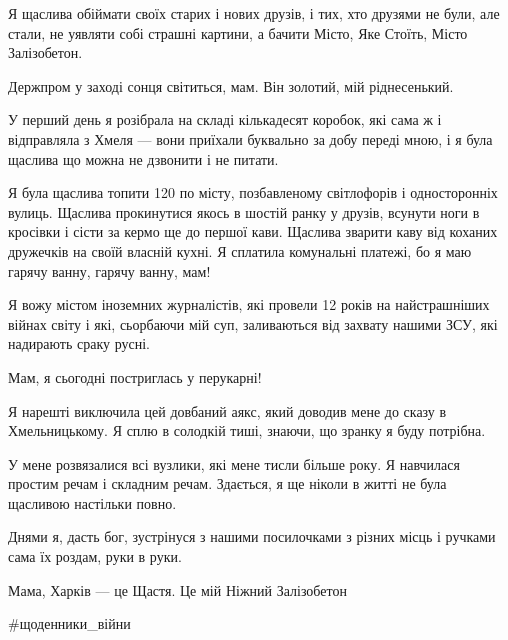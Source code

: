 Я щаслива обіймати своїх старих і нових друзів, і тих, хто друзями не були, але
стали, не уявляти собі страшні картини, а бачити Місто, Яке Стоїть, Місто
Залізобетон.


Держпром у заході сонця світиться, мам. Він золотий, мій ріднесенький.

У перший день я розібрала на складі кількадесят коробок, які сама ж і
відправляла з Хмеля — вони приїхали буквально за добу переді мною, і я була
щаслива що можна не дзвонити і не питати. 


Я була щаслива топити 120 по місту, позбавленому світлофорів і односторонніх
вулиць. Щаслива прокинутися якось в шостій ранку у друзів, всунути ноги в
кросівки і сісти за кермо ще до першої кави. Щаслива зварити каву від коханих
дружечків на своїй власній кухні. Я сплатила комунальні платежі, бо я маю
гарячу ванну, гарячу ванну, мам!


Я вожу містом іноземних журналістів, які провели 12 років на найстрашніших
війнах світу і які, сьорбаючи мій суп, заливаються від захвату нашими ЗСУ, які
надирають сраку русні. 


Мам, я сьогодні постриглась у перукарні!

Я нарешті виключила цей довбаний аякс, який доводив мене до сказу в
Хмельницькому. Я сплю в солодкій тиші, знаючи, що зранку я буду потрібна.

У мене розвязалися всі вузлики, які мене тисли більше року. Я навчилася простим
речам і складним речам. Здається, я ще ніколи в житті не була щасливою
настільки повно.

Днями я, дасть бог, зустрінуся з нашими посилочками з різних місць і ручками
сама їх роздам, руки в руки. 

Мама, Харків — це Щастя. Це мій Ніжний Залізобетон

\#щоденники\_війни

